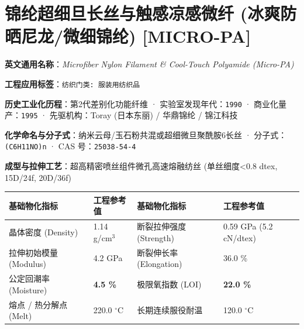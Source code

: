 \documentclass[11pt,openright,twoside,UTF8]{ctexbook}
\begin{document}
\section{锦纶超细旦长丝与触感凉感微纤 (冰爽防晒尼龙/微细锦纶) [MICRO-PA]}
\label{sec:micro-pa}

\noindent\textbf{英文通用名称}：\textit{Microfiber Nylon Filament \& Cool-Touch Polyamide (Micro-PA)}\par
\noindent\textbf{工程应用标签}：\texttt{纺织门类: 服装用纺织品}\par
\noindent\textbf{历史工业化历程}：第2代差别化功能纤维 · 实验室发现年代：\texttt{1990} · 商业化量产：\texttt{1995} · 先驱机构：Toray (日本东丽) / 华鼎锦纶 / 锦江科技\par
\noindent\textbf{化学命名与分子式}：纳米云母/玉石粉共混或超细微旦聚酰胺6长丝 · 分子式：\texttt{(C6H11NO)n} · CAS 号：\texttt{25038-54-4}\par
\noindent\textbf{成型与拉伸工艺}：超高精密喷丝组件微孔高速熔融纺丝 (单丝细度\textless{}0.8 dtex, 15D/24f, 20D/36f)\par

\vspace{0.15cm}
\begin{center}
\small
\begin{tabularx}{\textwidth}{p{3.8cm}Xp{3.8cm}X}
\toprule
\textbf{基础物化指标} & \textbf{工程参考值} & \textbf{基础物化指标} & \textbf{工程参考值} \\
\midrule
晶体密度 (Density) & 1.14 g/cm$^3$ & 断裂拉伸强度 (Strength) & 0.59 GPa (5.2 cN/dtex) \\
拉伸初始模量 (Modulus) & 4.2 GPa & 断裂伸长率 (Elongation) & 36.0 \% \\
公定回潮率 (Moisture) & \textbf{4.5 \%} & 极限氧指数 (LOI) & \textbf{22.0 \%} \\
熔点 / 热分解点 (Melt) & 220.0 $^\circ\mathrm{C}$ & 长期连续服役耐温 & 120.0 $^\circ\mathrm{C}$ \\
\bottomrule
\end{tabularx}
\end{center}
\vspace{0.15cm}
\end{document}
